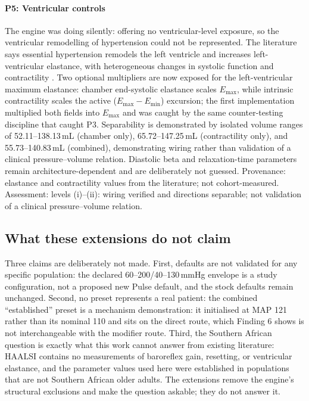 \documentclass[preprint,12pt,nopreprintline]{elsarticle}
\begin{document}
\paragraph{P5: Ventricular controls} The engine was doing silently: offering no ventricular-level exposure, so the ventricular remodelling of hypertension could not be represented. The literature says essential hypertension remodels the left ventricle \cite{ganau1992} and increases left-ventricular elastance, with heterogeneous changes in systolic function and contractility \cite{cohensolal1994}. Two optional multipliers are now exposed for the left-ventricular maximum elastance: chamber end-systolic elastance scales $E_{\mathrm{max}}$, while intrinsic contractility scales the active ($E_{\mathrm{max}} - E_{\mathrm{min}}$) excursion; the first implementation multiplied both fields into $E_{\mathrm{max}}$ and was caught by the same counter-testing discipline that caught P3. Separability is demonstrated by isolated volume ranges of 52.11--138.13\,mL (chamber only), 65.72--147.25\,mL (contractility only), and 55.73--140.83\,mL (combined), demonstrating wiring rather than validation of a clinical pressure--volume relation. Diastolic beta and relaxation-time parameters remain architecture-dependent and are deliberately not guessed. Provenance: elastance and contractility values from the literature; not cohort-measured. Assessment: levels (i)--(ii): wiring verified and directions separable; not validation of a clinical pressure--volume relation.

\subsection{What these extensions do not claim}

Three claims are deliberately not made. First, defaults are not validated for any specific population: the declared 60--200/40--130\,mmHg envelope is a study configuration, not a proposed new Pulse default, and the stock defaults remain unchanged. Second, no preset represents a real patient: the combined ``established'' preset is a mechanism demonstration: it initialised at MAP 121 rather than its nominal 110 and sits on the direct route, which Finding 6 shows is not interchangeable with the modifier route. Third, the Southern African question is exactly what this work cannot answer from existing literature: HAALSI contains no measurements of baroreflex gain, resetting, or ventricular elastance, and the parameter values used here were established in populations that are not Southern African older adults. The extensions remove the engine's structural exclusions and make the question askable; they do not answer it.
\end{document}
